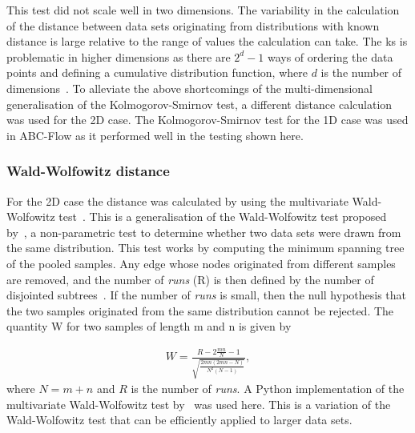 This test did not scale well in two dimensions. The variability in the calculation of the distance between data sets originating from distributions with known distance is large relative to the range of values the calculation can take. The \acrshort{ks} is problematic in higher dimensions as there are  $2^d − 1$ ways of ordering the data points and defining a cumulative distribution function, where $d$ is the number of dimensions~\autocite{Lopes:2007vk}. To alleviate the above shortcomings of the multi-dimensional generalisation of the Kolmogorov-Smirnov test, a different distance calculation was used for the 2D case. The Kolmogorov-Smirnov test for the 1D case was used in ABC-Flow as it performed well in the testing shown here. 

 
\subsubsection{Wald-Wolfowitz distance}

For the 2D case the distance was calculated by using the multivariate Wald-Wolfowitz test~\autocite{Friedman:1979vm}. This is a generalisation of the Wald-Wolfowitz test proposed by~\autocite{Wald:1940wt}, a non-parametric test to determine whether two data sets were drawn from the same distribution. This test works by computing the minimum spanning tree of the pooled samples. Any edge whose nodes originated from different samples are removed, and the number of \textit{runs} (R) is then defined by the number of disjointed subtrees~\autocite{Friedman:1979vm}. If the number of \textit{runs} is small, then the null hypothesis that the two samples originated from the same distribution cannot be rejected. The quantity W for two samples of length m and n is given by 
 
\begin{align}
W = \frac{R - 2\frac{mn}{N}-1}{\sqrt{\frac{2mn(2mn-N)}{N^2(N-1)}}},
\end{align}
where $N = m + n$ and $R$ is the number of \textit{runs}. A Python implementation of the multivariate Wald-Wolfowitz test by~\textcite{Monaco:2014wx} was used here. This is a variation of the Wald-Wolfowitz test that can be efficiently applied to larger data sets. 


